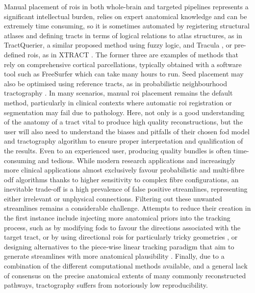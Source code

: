 \documentclass[12pt,phd,a4paper,twoside]{ucl_thesis}
\begin{document}
Manual placement of \glspl{roi} in both whole-brain and targeted pipelines represents a significant intellectual burden, relies on expert anatomical knowledge and can be extremely time consuming, so it is sometimes automated by registering structural atlases and defining tracts in terms of logical relations to atlas structures, as in TractQuerier\autocite{Wassermann2016}, a similar proposed method using fuzzy logic\autocite{Delmonte2019}, and Tracula \autocite{Yendiki2011}, or pre-defined \glspl{roi}, as in XTRACT \autocite{Warrington2020}.
The former three are examples of methods that rely on comprehensive cortical parcellations, typically obtained with a software tool such as FreeSurfer\autocite{Desikan2006,FischlSalat2002} which can take many hours to run.
Seed placement may also be optimised using reference tracts, as in probabilistic neighbourhood tractography \autocite{Clayden2006,Clayden2009}.
In many scenarios, manual \gls{roi} placement remains the default method, particularly in clinical contexts where automatic \gls{roi} registration or segmentation may fail due to pathology.
Here, not only is a good understanding of the anatomy of a tract vital to produce high quality reconstructions, but the user will also need to understand the biases and pitfalls of their chosen \gls{fod} model and tractography algorithm to ensure proper interpretation and qualification of the results\autocite{Rheault2020,Rheault2022}.
Even to an experienced user, producing quality bundles is often time-consuming and tedious.
While modern research applications and increasingly more clinical applications almost exclusively favour probabilistic and multi-fibre \gls{odf} algorithms thanks to higher sensitivity to complex fibre configurations\autocite{Yang2021}, an inevitable trade-off is a high prevalence of false positive streamlines, representing either irrelevant or unphysical connections.
Filtering out these unwanted streamlines remains a considerable challenge\autocite{Jorgens2021}.
Attempts to reduce their creation in the first instance include injecting more anatomical priors into the tracking process, such as by modifying \glspl{fod} to favour the directions associated with the target tract\autocite{Rheault2019}, or by using directional \glspl{roi} for particularly tricky geometries \autocite{Chamberland2017}, or designing alternatives to the piece-wise linear tracking paradigm that aim to generate streamlines with more anatomical plausibility \autocite{Schomburg2017,Aydogan2021}.
Finally, due to a combination of the different computational methods available, and a general lack of consensus on the precise anatomical extents of many commonly reconstructed pathways, tractography suffers from notoriously low reproducibility\autocite{Schilling2021a}.
\end{document}

